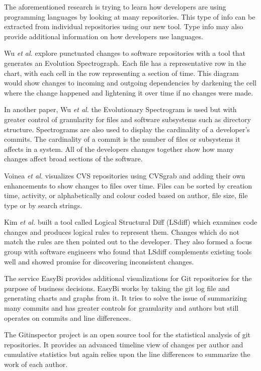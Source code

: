 The aforementioned research is trying to learn how developers are using programming languages by looking at many repositories. This type of info can be extracted from individual repositories using our new tool. Type info may also provide additional information on how developers use languages.

Wu \textit{et al.} \cite{wu2004a} explore punctuated changes to software repositories with a tool that generates an Evolution Spectrograph. Each file has a representative row in the chart, with each cell in the row representing a section of time. This diagram would show changes to incoming and outgoing dependencies by darkening the cell where the change happened and lightening it over time if no changes were made.

In another paper, Wu \textit{et al.} \cite{wu2004} the Evolutionary Spectrogram is used but with greater control of granularity for files and software subsystems such as directory structure. Spectrograms are also used to display the cardinality of a developer's commits. The cardinality of a commit is the number of files or subsystems it affects in a system. All of the developers changes together show how many changes affect broad sections of the software.

Voinea \textit{et al.} \cite{voinea2006} visualizes CVS repositories using CVSgrab and adding their own enhancements to show changes to files over time. Files can be sorted by creation time, activity, or alphabetically and colour coded based on author, file size, file type or by search strings.

Kim \textit{et al.} \cite{Kim:2009:DRS:1555001.1555046} built a tool called Logical Structural Diff (LSdiff) which examines code changes and produces logical rules to represent them. Changes which do not match the rules are then pointed out to the developer. They also formed a focus group with software engineers who found that LSdiff complements existing tools well and showed promise for discovering inconsistent changes.

The service EasyBi \cite{EasyBi} provides additional visualizations for Git repositories for the purpose of business decisions. EasyBi works by taking the git log file and generating charts and graphs from it. It tries to solve the issue of summarizing many commits and has greater controls for granularity and authors but still operates on commits and line differences.

The Gitinspector project \cite{Gitinspector} is an open source tool for the statistical analysis of git repositories. It provides an advanced timeline view of changes per author and cumulative statistics but again relies upon the line differences to summarize the work of each author.

